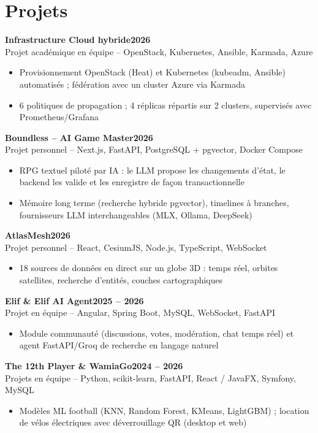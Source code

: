 \documentclass[10pt]{article}
\newcommand{\entry}[4]{%
  \textbf{#1}\hfill\textbf{#2}\\
  #3\hfill #4\vspace{-1pt}}
\newcommand{\gap}{\vspace{3pt}}
\begin{document}
\section{Projets}

\entry{Infrastructure Cloud hybride}{2026}{Projet académique en équipe -- OpenStack, Kubernetes, Ansible, Karmada, Azure}{}
\begin{itemize}
  \item Provisionnement OpenStack (Heat) et Kubernetes (kubeadm, Ansible) automatisés ; fédération avec un cluster Azure via Karmada
  \item 6 politiques de propagation ; 4 réplicas répartis sur 2 clusters, supervisés avec Prometheus/Grafana
\end{itemize}
\gap

\entry{Boundless -- AI Game Master}{2026}{Projet personnel -- Next.js, FastAPI, PostgreSQL + pgvector, Docker Compose}{}
\begin{itemize}
  \item RPG textuel piloté par IA : le LLM propose les changements d'état, le backend les valide et les enregistre de façon transactionnelle
  \item Mémoire long terme (recherche hybride pgvector), timelines à branches, fournisseurs LLM interchangeables (MLX, Ollama, DeepSeek)
\end{itemize}
\gap

\entry{AtlasMesh}{2026}{Projet personnel -- React, CesiumJS, Node.js, TypeScript, WebSocket}{}
\begin{itemize}
  \item 18 sources de données en direct sur un globe 3D : temps réel, orbites satellites, recherche d'entités, couches cartographiques
\end{itemize}
\gap

\entry{Elif \& Elif AI Agent}{2025 -- 2026}{Projet en équipe -- Angular, Spring Boot, MySQL, WebSocket, FastAPI}{}
\begin{itemize}
  \item Module communauté (discussions, votes, modération, chat temps réel) et agent FastAPI/Groq de recherche en langage naturel
\end{itemize}
\gap

\entry{The 12th Player \textmd{\& WamiaGo}}{2024 -- 2026}{Projets en équipe -- Python, scikit-learn, FastAPI, React / JavaFX, Symfony, MySQL}{}
\begin{itemize}
  \item Modèles ML football (KNN, Random Forest, KMeans, LightGBM) ; location de vélos électriques avec déverrouillage QR (desktop et web)
\end{itemize}
\end{document}
